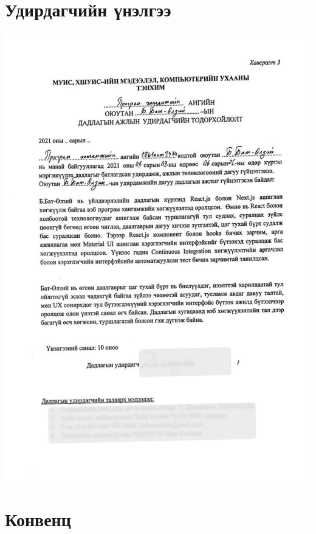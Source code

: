 
\appendix
{}

\chapter{Удирдагчийн үнэлгээ}
\includegraphics[width=14cm]{images/review.jpg}

\chapter{Конвенц}

